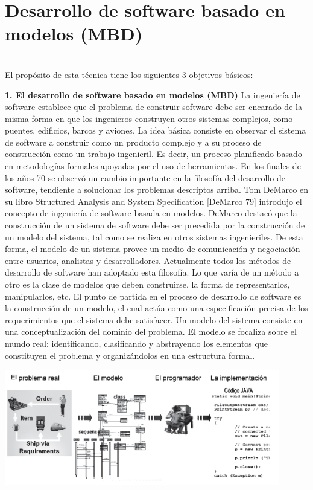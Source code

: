 \section{Desarrollo de software basado en modelos (MBD)} 

\textbf{}\\
El propósito de esta técnica tiene los siguientes 3 objetivos básicos:

\begin{flushleft}

\begin{center}
	
	\end{center}
\begin{itemize}
\textbf{1.	El desarrollo de software basado en modelos (MBD) }
La ingeniería de software establece que el problema de construir software debe ser encarado de la misma forma en que los ingenieros construyen otros sistemas complejos, como puentes, edificios, barcos y aviones. La idea básica consiste en observar el sistema de software a construir como un producto complejo y a su proceso de construcción como un trabajo ingenieril. Es decir, un proceso planificado basado en metodologías formales apoyadas por el uso de herramientas. 
En los finales de los años 70 se observó un cambio importante en la filosofía del desarrollo de software, tendiente a solucionar los problemas descriptos arriba. Tom DeMarco en su libro Structured Analysis and System Specification [DeMarco 79] introdujo el concepto de ingeniería de software basada en modelos. DeMarco destacó que la construcción de un sistema de software debe ser precedida por la construcción de un modelo del sistema, tal como se realiza en otros sistemas ingenieriles. De esta forma, el modelo de un sistema provee un medio de comunicación y negociación entre usuarios, analistas y desarrolladores. Actualmente todos los métodos de desarrollo de software han adoptado esta filosofía. Lo que varía de un método a otro es la clase de modelos que deben construirse, la forma de representarlos, manipularlos, etc. El punto de partida en el proceso de desarrollo de software es la construcción de un modelo, el cual actúa como una especificación precisa de los requerimientos que el sistema debe satisfacer.  Un modelo del sistema consiste en una conceptualización del dominio del problema. El modelo  se focaliza sobre el mundo real: identificando, clasificando y abstrayendo los elementos que constituyen el problema y organizándolos en una estructura formal. 

\begin{center}
    \includegraphics[width=12cm]{./Imagenes/mdd1}
    \end{center}


\end{itemize}
\end{flushleft}
